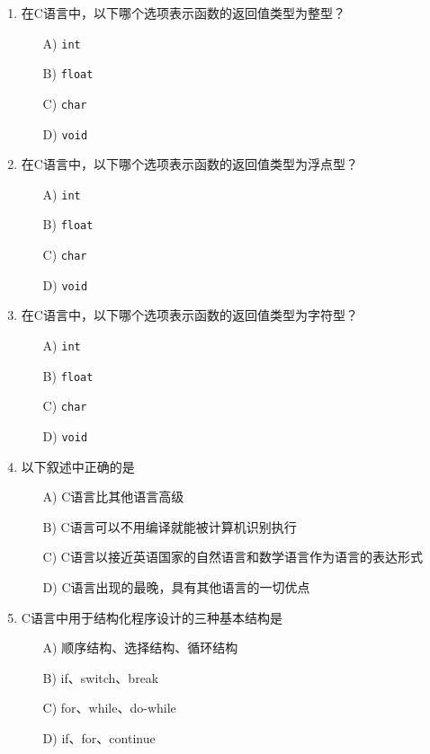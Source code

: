 \documentclass[a4paper,12pt]{article}
\begin{document}
\begin{enumerate}
	\item 在C语言中，以下哪个选项表示函数的返回值类型为整型？
	      \begin{enumerate}
		      \item[A)] \texttt{int}
		      \item[B)] \texttt{float}
		      \item[C)] \texttt{char}
		      \item[D)] \texttt{void}
	      \end{enumerate}
	      \vspace{0.3cm}

	\item 在C语言中，以下哪个选项表示函数的返回值类型为浮点型？
	      \begin{enumerate}
		      \item[A)] \texttt{int}
		      \item[B)] \texttt{float}
		      \item[C)] \texttt{char}
		      \item[D)] \texttt{void}
	      \end{enumerate}
	      \vspace{0.3cm}

	\item 在C语言中，以下哪个选项表示函数的返回值类型为字符型？
	      \begin{enumerate}
		      \item[A)] \texttt{int}
		      \item[B)] \texttt{float}
		      \item[C)] \texttt{char}
		      \item[D)] \texttt{void}
	      \end{enumerate}
	      \vspace{0.3cm}

	\item 以下叙述中正确的是
	      \begin{enumerate}
		      \item[A)] C语言比其他语言高级
		      \item[B)] C语言可以不用编译就能被计算机识别执行
		      \item[C)] C语言以接近英语国家的自然语言和数学语言作为语言的表达形式
		      \item[D)] C语言出现的最晚，具有其他语言的一切优点
	      \end{enumerate}
	      \vspace{0.3cm}

	\item C语言中用于结构化程序设计的三种基本结构是
	      \begin{enumerate}
		      \item[A)] 顺序结构、选择结构、循环结构
		      \item[B)] if、switch、break
		      \item[C)] for、while、do-while
		      \item[D)] if、for、continue
	      \end{enumerate}
	      \vspace{0.3cm}


\end{enumerate}
\end{document}
